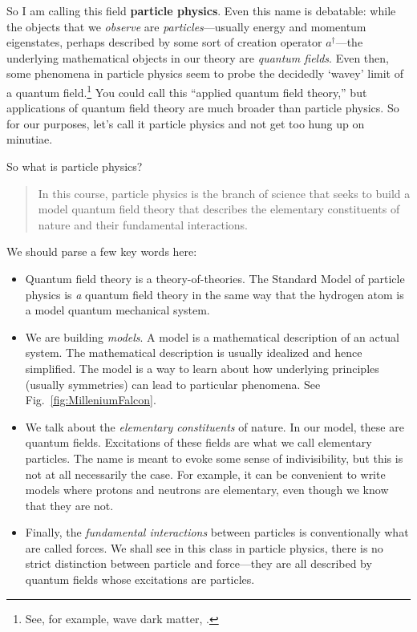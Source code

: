 \documentclass[12pt, oneside]{report}    %
\begin{document}
So I am calling this field \textbf{particle physics}. Even this name is debatable: while the objects that we \emph{observe} are \emph{particles}---usually energy and momentum eigenstates, perhaps described by some sort of creation operator $a^\dag$---the underlying mathematical objects in our theory are \emph{quantum fields}. Even then, some phenomena in particle physics seem to probe the decidedly `wavey' limit of a quantum field.\footnote{See, for example, wave dark matter, .} You could call this ``applied quantum field theory,'' but applications of quantum field theory are much broader than particle physics. So for our purposes, let's call it particle physics and not get too hung up on minutiae.

So what is particle physics? \begin{quote}In this course, particle physics is the branch of science that seeks to build a model quantum field theory that describes the elementary constituents of nature and their fundamental interactions.\end{quote} We should parse a few key words  here:
\begin{itemize}
    \item Quantum field theory is a theory-of-theories. The Standard Model of particle physics is \emph{a} quantum field theory in the same way that the hydrogen atom is a model quantum mechanical system. 
    \item We are building \emph{models}. A model is a mathematical description of an actual system. The mathematical description is usually idealized and hence simplified. The model is a way to learn about how underlying principles (usually symmetries) can lead to particular phenomena. See Fig.~\ref{fig:MilleniumFalcon}.
    \item We talk about the \emph{elementary constituents} of nature. In our model, these are quantum fields. Excitations of these fields are what we call elementary particles. The name is meant to evoke some sense of indivisibility, but this is not at all necessarily the case. For example, it can be convenient to write models where protons and neutrons are elementary, even though we know that they are not. 
    \item Finally, the \emph{fundamental interactions} between particles is conventionally what are called forces. We shall see in this class in particle physics, there is no strict distinction between particle and force---they are all described by quantum fields whose excitations are particles. 
\end{itemize}
\end{document}
